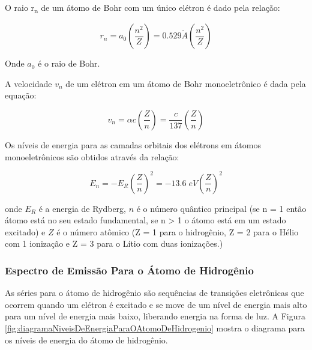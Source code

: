 \documentclass[11pt,a4paper]{article}
\begin{document}
                O raio r\textsubscript{n} de um átomo de Bohr com um único elétron é dado pela  relação:

                    \begin{equation}
                        r_n = a_0 \left(\frac{n^2}{Z}\right) = 0.529 \mathring{A} \left(\frac{n^2}{Z}\right)
                    \end{equation}

                Onde $a_0$ é o raio de Bohr.

                A velocidade $v_n$ de um elétron em um átomo de Bohr monoeletrônico é dada pela equação:

                    \begin{equation}
                        v_n  = \alpha c \left(\frac{Z}{n}\right) = \frac{c}{137}\left(\frac{Z}{n}\right)
                    \end{equation}

                Os níveis de energia para as camadas orbitais dos elétrons em átomos monoeletrônicos são obtidos através da relação:

                    \begin{equation}
                        E_n = -E_R \left(\frac{Z}{n}\right)^2 = -13.6 \; eV \left(\frac{Z}{n}\right)^2
                    \end{equation}

                \noindent onde $E_R$ é a energia de Rydberg, $n$ é  o número quântico principal (se n = 1 então átomo está no seu estado fundamental, se n > 1 o átomo está em um estado excitado) e $Z$ é o número atômico (Z = 1 para o hidrogênio, Z = 2 para o Hélio com 1 ionização e Z = 3 para o Lítio com duas ionizações.) 
            
            \subsubsection{Espectro de Emissão Para o Átomo de Hidrogênio}

                As séries para o átomo de hidrogênio são sequências de transições eletrônicas que ocorrem quando um elétron é excitado e se move de um nível de energia mais alto para um nível de energia mais baixo, liberando energia na forma de luz. A Figura \ref{fig:diagramaNiveisDeEnergiaParaOAtomoDeHidrogenio} mostra o diagrama para os níveis de energia do átomo de hidrogênio. 
\end{document}
